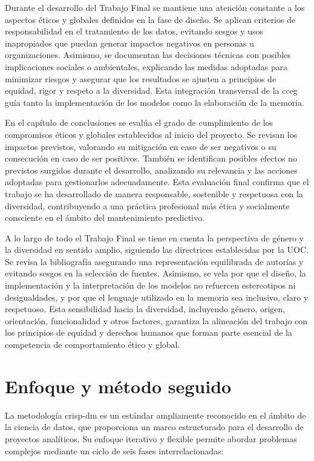 \documentclass[IB]{TFUOC}
\begin{document}
Durante el desarrollo del Trabajo Final se mantiene una atención constante a los aspectos éticos y globales definidos en
la fase de diseño. Se aplican criterios de responsabilidad en el tratamiento de los datos, evitando sesgos y usos
inapropiados que puedan generar impactos negativos en personas u organizaciones. Asimismo, se documentan las decisiones
técnicas con posibles implicaciones sociales o ambientales, explicando las medidas adoptadas para minimizar riesgos y
asegurar que los resultados se ajusten a principios de equidad, rigor y respeto a la diversidad. Esta integración
transversal de la \gls{cceg} guía tanto la implementación de los modelos como la elaboración de la memoria.

En el capítulo de conclusiones se evalúa el grado de cumplimiento de los compromisos éticos y globales establecidos al
inicio del proyecto. Se revisan los impactos previstos, valorando su mitigación en caso de ser negativos o su
consecución en caso de ser positivos. También se identifican posibles efectos no previstos surgidos durante el
desarrollo, analizando su relevancia y las acciones adoptadas para gestionarlos adecuadamente. Esta evaluación final
confirma que el trabajo se ha desarrollado de manera responsable, sostenible y respetuosa con la diversidad,
contribuyendo a una práctica profesional más ética y socialmente consciente en el ámbito del mantenimiento predictivo.

A lo largo de todo el Trabajo Final se tiene en cuenta la perspectiva de género y la diversidad en sentido amplio,
siguiendo las directrices establecidas por la UOC. Se revisa la bibliografía asegurando una representación equilibrada
de autorías y evitando sesgos en la selección de fuentes. Asimismo, se vela por que el diseño, la implementación y la
interpretación de los modelos no refuercen estereotipos ni desigualdades, y por que el lenguaje utilizado en la memoria
sea inclusivo, claro y respetuoso. Esta sensibilidad hacia la diversidad, incluyendo género, origen, orientación,
funcionalidad y otros factores, garantiza la alineación del trabajo con los principios de equidad y derechos humanos que
forman parte esencial de la competencia de comportamiento ético y global.

\section{Enfoque y método seguido}

La metodología \gls{crisp-dm} es un estándar ampliamente reconocido en el ámbito de la ciencia de datos, que proporciona
un marco estructurado para el desarrollo de proyectos analíticos. Su enfoque iterativo y flexible permite abordar
problemas complejos mediante un ciclo de seis fases interrelacionadas:
\end{document}
